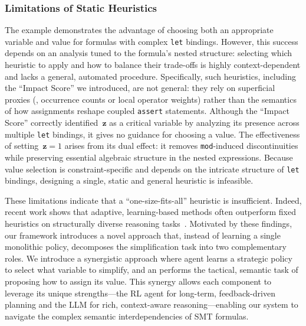\subsubsection{Limitations of Static Heuristics}
The example demonstrates the advantage of choosing both an appropriate variable and value for formulas with complex \texttt{let} bindings. However, this success depends on an analysis tuned to the formula's nested structure: selecting which heuristic to apply and how to balance their trade-offs is highly context-dependent and lacks a general, automated procedure. Specifically, such heuristics, including the ``Impact Score'' we introduced, are not general: they rely on superficial proxies (\eg, occurrence counts or local operator weights) rather than the semantics of how assignments reshape coupled \texttt{assert} statements. Although the ``Impact Score'' correctly identified~$\mathbf{z}$ as a critical variable by analyzing its presence across multiple \texttt{let} bindings, it gives no guidance for choosing a value. The effectiveness of setting~$\mathbf{z}=1$ arises from its dual effect: it removes \texttt{mod}-induced discontinuities while preserving essential algebraic structure in the nested expressions. Because value selection is constraint-specific and depends on the intricate structure of \texttt{let} bindings, designing a single, static and general heuristic is infeasible.

These limitations indicate that a ``one-size-fits-all'' heuristic is insufficient. Indeed, recent work shows that adaptive, learning-based methods often outperform fixed heuristics on structurally diverse reasoning tasks~\cite{chen2021synthesize,wenConstraintSolvingDeep2020,yangExploringStrategiesGuiding2024,luoBoostingSymbolicExecutionTime2021}. Motivated by these findings, our framework introduces a novel approach that, instead of learning a single monolithic policy, decomposes the simplification task into two complementary roles. We introduce a synergistic approach where \RL{} agent learns a strategic policy to select what variable to simplify, and an \LLM{} performs the tactical, semantic task of proposing how to assign its value. This synergy allows each component to leverage its unique strengths---the RL agent for long-term, feedback-driven planning and the LLM for rich, context-aware reasoning---enabling our system to navigate the complex semantic interdependencies of SMT formulas.

